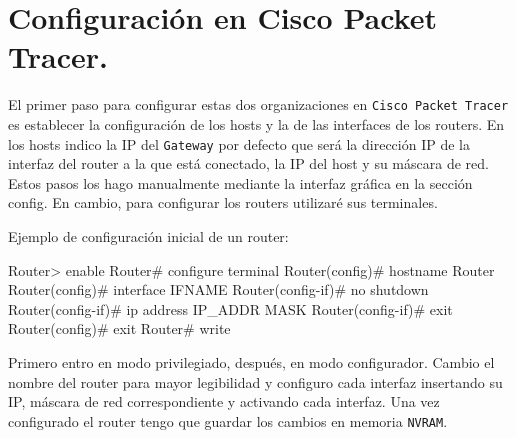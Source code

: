 	
\section{Configuración en Cisco Packet Tracer.}

\par El primer paso para configurar estas dos organizaciones en \texttt{Cisco Packet Tracer} es establecer la configuración de los hosts y la de las interfaces de los routers. En los hosts indico la IP del \texttt{Gateway} por defecto que será la dirección IP de la interfaz del router a la que está conectado, la IP del host y su máscara de red. Estos pasos los hago manualmente mediante la interfaz gráfica en la sección config. En cambio, para configurar los routers utilizaré sus terminales.
\par Ejemplo de configuración inicial de un router:
\begin{listing}[style=consola]
Router> enable
Router# configure terminal
Router(config)# hostname Router
Router(config)# interface IFNAME
Router(config-if)# no shutdown
Router(config-if)# ip address IP_ADDR MASK 
Router(config-if)# exit
Router(config)# exit
Router# write
\end{listing}
\par Primero entro en modo privilegiado, después, en modo configurador. Cambio el nombre del router para mayor legibilidad y configuro cada interfaz insertando su IP, máscara de red correspondiente y activando cada interfaz. Una vez configurado el router tengo que guardar los cambios en memoria \texttt{NVRAM}.